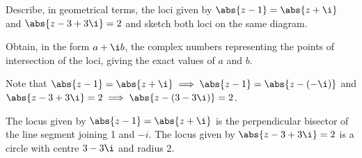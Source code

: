 \begin{problem}
    Describe, in geometrical terms, the loci given by $\abs{z - 1} = \abs{z + \i}$ and $\abs{z - 3 + 3\i} = 2$ and sketch both loci on the same diagram.

    Obtain, in the form $a + \i b$, the complex numbers representing the points of intersection of the loci, giving the exact values of $a$ and $b$.
\end{problem}
\begin{solution}
    Note that $\abs{z - 1} = \abs{z + \i} \implies \abs{z - 1} = \abs{z - (-\i)}$ and $\abs{z - 3 + 3\i} = 2 \implies \abs{z - (3 - 3\i)} = 2$.
    
    The locus given by $\abs{z - 1} = \abs{z + \i}$ is the perpendicular bisector of the line segment joining 1 and $-i$. The locus given by $\abs{z - 3 + 3\i} = 2$ is a circle with centre $3 - 3\i$ and radius 2.

    \begin{center}
\end{center}
\end{solution}
